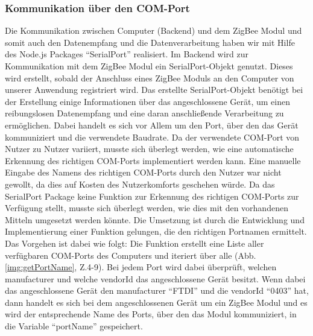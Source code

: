 \documentclass[]{article}
\begin{document}
			\subsubsection{Kommunikation über den COM-Port}
			Die Kommunikation zwischen Computer (Backend) und dem ZigBee Modul und somit auch den Datenempfang und die Datenverarbeitung haben wir mit Hilfe des Node.js Packages “SerialPort” realisiert.\newline
Im Backend wird zur Kommunikation mit dem ZigBee Modul ein SerialPort-Objekt genutzt. Dieses wird erstellt, sobald der Anschluss eines ZigBee Moduls an den Computer von unserer Anwendung registriert wird.\newline
Das erstellte SerialPort-Objekt benötigt bei der Erstellung einige Informationen über das angeschlossene Gerät, um einen reibungslosen Datenempfang und eine daran anschließende Verarbeitung zu ermöglichen. Dabei handelt es sich vor Allem um den Port, über den das Gerät kommuniziert und die verwendete Baudrate. Da der verwendete COM-Port von Nutzer zu Nutzer variiert, musste sich überlegt werden, wie eine automatische Erkennung des richtigen COM-Ports implementiert werden kann. Eine manuelle Eingabe des Namens des richtigen COM-Ports durch den Nutzer war nicht gewollt, da dies auf Kosten des Nutzerkomforts geschehen würde. \newline 
Da das SerialPort Package keine Funktion zur Erkennung des richtigen COM-Ports zur Verfügung stellt, musste sich überlegt werden, wie dies mit den vorhandenen Mitteln umgesetzt werden könnte. Die Umsetzung ist durch die Entwicklung und Implementierung einer Funktion gelungen, die den richtigen Portnamen ermittelt. Das Vorgehen ist dabei wie folgt:\newline 
Die Funktion erstellt eine Liste aller verfügbaren COM-Ports des Computers und iteriert über alle (Abb. \ref{img:getPortName}, Z.4-9). Bei jedem Port wird dabei überprüft, welchen manufacturer und welche vendorId das angeschlossene Gerät besitzt. Wenn dabei das angeschlossene Gerät den manufacturer “FTDI” und die vendorId “0403” hat, dann handelt es sich bei dem angeschlossenen Gerät um ein ZigBee Modul und es wird der entsprechende Name des Ports, über den das Modul kommuniziert, in die Variable “portName” gespeichert.\newline
\end{document}
